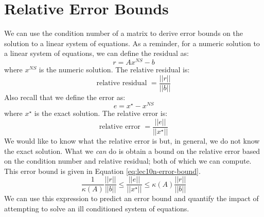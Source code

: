 \section{Relative Error Bounds}
We can use the condition number of a matrix to derive error bounds on the solution to a linear system of equations.  As a reminder, for a numeric solution to a linear system of equations, we can define the residual as:
\begin{equation*}
r = Ax^{NS}-b
\end{equation*}
where $x^{NS}$ is the numeric solution.  The relative residual is:
\begin{equation*}
\text{relative residual } = \frac{||r||}{||b||}
\end{equation*}
Also recall that we define the error as:
\begin{equation*}
e = x^{\star} - x^{NS}
\end{equation*}
where $x^{\star}$ is the exact solution. The relative error is:
\begin{equation*}
\text{relative error } = \frac{||e||}{||x^{\star}||}
\end{equation*}
We would like to know what the relative error is but, in general, we do not know the exact solution.  What we \emph{can} do is obtain a bound on the relative error based on the condition number and relative residual; both of which we can compute.  This error bound is given in Equation \ref{eq:lec10n-error-bound}.
\begin{equation}
\frac{1}{\kappa(A)}\frac{||r||}{||b||} \le \frac{||e||}{||x^{\star}||} \le \kappa(A) \frac{||r||}{||b||}
\label{eq:lec10n-error-bound}
\end{equation}
We can use this expression to predict an error bound and quantify the impact of attempting to solve an ill conditioned system of equations.

